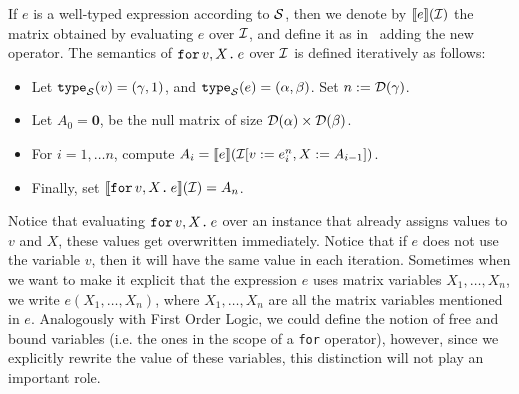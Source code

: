If $e$ is a well-typed expression according to $\mathcal{S}$, then we denote by $\llbracket e \rrbracket(\mathcal{I})$ the matrix obtained by evaluating $e$ over $\mathcal{I}$, and define it as in \lang\, adding the new operator. The semantics of $\texttt{for}\, v,X \texttt{.}\, e$ over $\mathcal{I}$ is defined iteratively as follows:
\begin{itemize}
\item Let $\texttt{type}_{\mathcal{S}}(v)= (\gamma,1)$, and $\texttt{type}_{\mathcal{S}}(e) = (\alpha,\beta)$. Set $n := \mathcal{D}(\gamma)$.
\item Let $A_0 = \mathbf{0}$, be the null matrix of size $\mathcal{D}(\alpha)\times \mathcal{D}(\beta)$.
\item For $i=1,\ldots n$, compute $A_i = \llbracket e \rrbracket(\mathcal{I}[v := e^{n}_i, X:= A_{i-1}])$.
\item Finally, set $\llbracket \texttt{for}\, v,X \texttt{.}\, e \rrbracket(\mathcal{I}) = A_{n}$.
\end{itemize}


Notice that evaluating $\texttt{for}\, v,X \texttt{.}\, e$ over an instance that already assigns values to $v$ and $X$, these values get overwritten immediately. Notice that if $e$ does not use the variable $v$, then it will have the same value in each iteration. Sometimes when we want to make it explicit that the expression $e$ uses matrix variables $X_1,\ldots ,X_n$, we write $e(X_1,\ldots ,X_n)$, where $X_1,\ldots ,X_n$ are all the matrix variables mentioned in $e$. Analogously with First Order Logic, we could define the notion of free and bound variables (i.e. the ones in the scope of a \texttt{for} operator), however, since we explicitly rewrite the value of these variables, this distinction will not play an important role.









